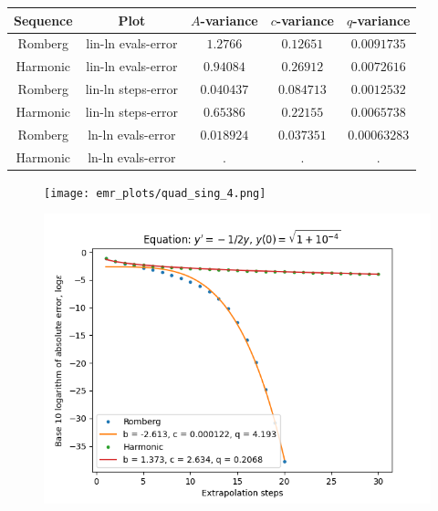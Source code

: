 \begin{table}[H]
    \centering
    \begin{tabular}{c|c||c|c|c}
Sequence & Plot & \(A\)-variance & \(c\)-variance & \(q\)-variance\\\hline
Romberg & lin-ln evals-error & \(1.2766\) & \(0.12651\) & \(0.0091735\) \\
Harmonic & lin-ln evals-error & \(0.94084\) & \(0.26912\) & \(0.0072616\) \\
Romberg & lin-ln steps-error & \(0.040437\) & \(0.084713\) & \(0.0012532\) \\
Harmonic & lin-ln steps-error & \(0.65386\) & \(0.22155\) & \(0.0065738\) \\
Romberg & ln-ln evals-error & \(0.018924\) & \(0.037351\) & \(0.00063283\) \\
Harmonic & ln-ln evals-error & . & . & . \\
    \end{tabular}
    \label{tab:my_label}
\end{table}

\begin{figure}[H]
\centering
\begin{minipage}{0.45\textwidth}
\centering
\texttt{[image: emr\_plots/quad\_sing\_4.png]}
\end{minipage}
\begin{minipage}{0.45\textwidth}
\centering
\includegraphics[scale=0.45]{emr_plots/quad_sing_4_hp_steps.png}
\end{minipage}
\end{figure}

